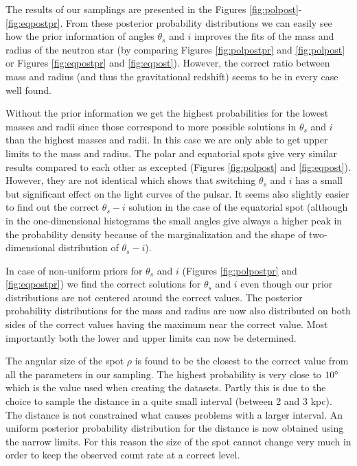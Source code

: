 \documentclass{wihuri}
\def\thetas{\theta_{s}}
\begin{document}
The results of our samplings are presented in the Figures \ref{fig:polpost}-\ref{fig:eqpostpr}. From these posterior probability distributions we can easily see how the prior information of angles $\thetas$ and $i$ improves the fits of the mass and radius of the neutron star (by comparing Figures \ref{fig:polpostpr} and \ref{fig:polpost} or Figures \ref{fig:eqpostpr} and \ref{fig:eqpost}). However, the correct ratio between mass and radius (and thus the gravitational redshift) seems to be in every case well found.

Without the prior information we get the highest probabilities for the lowest masses and radii since those correspond to more possible solutions in  $\thetas$ and $i$ than the highest masses and radii. In this case we are only able to get upper limits to the mass and radius. The polar and equatorial spots give very similar results compared to each other as excepted (Figures \ref{fig:polpost} and \ref{fig:eqpost}). However, they are not identical which shows that switching $\thetas$ and $i$ has a small but significant effect on the light curves of the pulsar. It seems also slightly easier to find out the correct $\thetas-i$ solution  in the case of the equatorial spot (although in the one-dimensional histograms the small angles give always a higher peak in the probability density because of the marginalization and the shape of two-dimensional distribution of $\thetas-i$). 

In case of non-uniform priors for $\thetas$ and $i$ (Figures \ref{fig:polpostpr} and \ref{fig:eqpostpr}) we find the correct solutions for $\thetas$ and $i$ even though our prior distributions are not centered  around the correct values. The posterior probability distributions for the mass and radius are now also distributed on both sides of the correct values having the maximum near the correct value. Most importantly both the lower and upper limits can now be determined.

The angular size of the spot $\rho$ is found to be the closest to the correct value from all the  parameters in our sampling. The highest probability is very close to $10 \degree$ which is the value used when creating the datasets. Partly this is due to the choice to sample the distance in a quite small interval (between 2 and 3 kpc). The distance is not constrained what causes problems with a larger interval. An uniform posterior probability distribution for the distance is now obtained using the narrow limits. For this reason the size of the spot cannot change very much in order to keep the observed count rate at a correct level. 
\end{document}

